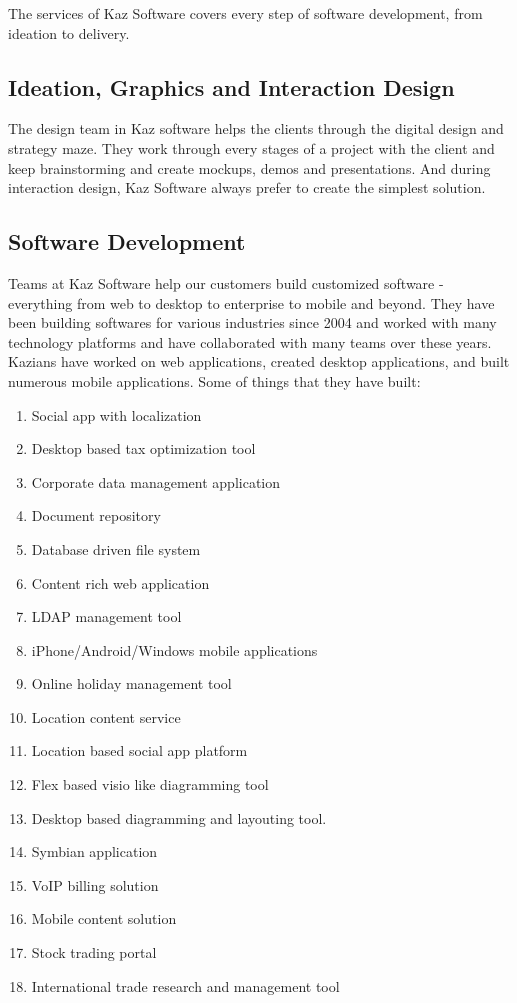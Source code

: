 The services of Kaz Software covers every step of software development, from ideation to delivery.

\subsection{Ideation, Graphics and Interaction Design}

The design team in Kaz software helps the clients through the digital design and strategy maze.
They work through every stages of a project with the client and keep brainstorming and create mockups, demos and presentations.
And during interaction design, Kaz Software always prefer to create the simplest solution.

\subsection{Software Development}

Teams at Kaz Software help our customers build  customized software - everything from web to desktop to enterprise to mobile and beyond. 
They have been building softwares for various industries since 2004 and worked with many technology platforms and have collaborated with many teams over these years. \\

Kazians have worked on web applications, created desktop applications, and built numerous mobile applications. Some of things that they have built:

\begin{enumerate}
    \item Social app with localization
    \item Desktop based tax optimization tool
    \item Corporate data management application
    \item Document repository
    \item Database driven file system
    \item Content rich web application
    \item LDAP management tool
    \item iPhone/Android/Windows mobile applications
    \item Online holiday management tool
    \item Location content service
    \item Location based social app platform
    \item Flex based visio like diagramming tool
    \item Desktop based diagramming and layouting tool.
    \item Symbian application
    \item VoIP billing solution
    \item Mobile content solution
    \item Stock trading portal
    \item International trade research and management tool
\end{enumerate}

